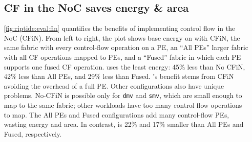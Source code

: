 \subsection{CF in the NoC saves energy \& area}
\autoref{fig:riptide:eval:fin} quantifies the benefits of implementing control flow in the NoC (CFiN).
% 
From left to right, the plot shows base energy on \riptide with CFiN,
the same fabric with every control-flow operation on a PE,
an ``All PEs'' larger fabric with all CF operations mapped to PEs,
and a ``Fused'' fabric in which each PE supports one fused CF operation.
% 
\riptide uses the least energy: 45\% less than No CFiN, 42\% less than All PEs, and 29\% less than Fused.
% 
\riptide's benefit stems from CFiN avoiding the overhead of a full PE.
%
Other configurations also have unique problems.
% 
No-CFiN is possible only for {\tt dmv} and {\tt smv}, which are small enough to map to the
same \riptide fabric; other workloads have too many control-flow operations to map.
% 
The All PEs and Fused configurations add many control-flow PEs, wasting energy and area.
% 
In contrast, \riptide is 22\% and 17\% smaller than All PEs and Fused, respectively.
